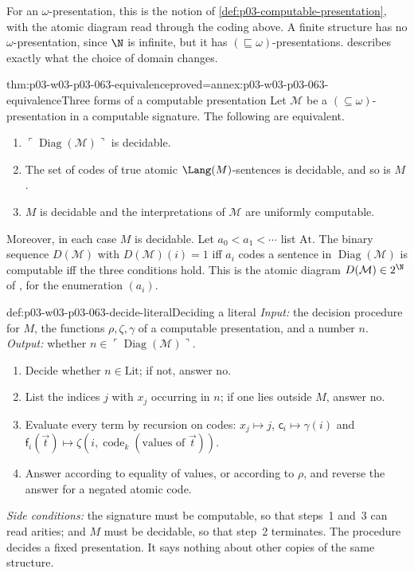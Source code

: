 For an \(\omega\)-presentation, this is the notion of
\cref{def:p03-computable-presentation}, with the atomic diagram read through
the coding above.  A finite structure has no \(\omega\)-presentation, since
\(\N\) is infinite, but it has \((\sqsubseteq\omega)\)-presentations.
 describes exactly what the choice of
domain changes.

\begin{hbtheorem}{thm:p03-w03-p03-063-equivalence}{proved=annex:p03-w03-p03-063-equivalence}{Three forms of a computable presentation}
Let \(\mathcal M\) be a \((\subseteq\omega)\)-presentation in a computable
signature.  The following are equivalent.
\begin{enumerate}
\item \(\ulcorner\operatorname{Diag}(\mathcal M)\urcorner\) is decidable.
\item The set of codes of true atomic \(\Lang(M)\)-sentences is decidable,
  and so is \(M\).
\item \(M\) is decidable and the interpretations of \(\mathcal M\) are
  uniformly computable.
\end{enumerate}
Moreover, in each case \(M\) is decidable.  Let \(a_0<a_1<\cdots\) list
\(\mathrm{At}\).  The binary sequence \(D(\mathcal M)\) with
\(D(\mathcal M)(i)=1\) iff \(a_i\) codes a sentence in
\(\operatorname{Diag}(\mathcal M)\) is computable iff the three conditions
hold.  This is the atomic diagram \(D(\mathcal M)\in2^{\N}\) of
\cite[Definition~I.2, p.~2]{Montalban2019CSTDraft}, for the enumeration
\((a_i)\).
\end{hbtheorem}

\begin{hbmethod}{def:p03-w03-p03-063-decide-literal}{Deciding a literal}
\emph{Input:} the decision procedure for \(M\), the functions
\(\rho,\zeta,\gamma\) of a computable presentation, and a number \(n\).
\emph{Output:} whether \(n\in\ulcorner\operatorname{Diag}(\mathcal M)\urcorner\).
\begin{enumerate}
\item Decide whether \(n\in\mathrm{Lit}\); if not, answer no.
\item List the indices \(j\) with \(x_j\) occurring in \(n\); if one lies
  outside \(M\), answer no.
\item Evaluate every term by recursion on codes:
  \(x_j\mapsto j\), \(\mathsf c_i\mapsto\gamma(i)\) and
  \(\mathsf f_i(\vec t)\mapsto\zeta(i,\operatorname{code}_k(\text{values of }\vec t))\).
\item Answer according to equality of values, or according to \(\rho\),
  and reverse the answer for a negated atomic code.
\end{enumerate}
\emph{Side conditions:} the signature must be computable, so that steps~1
and~3 can read arities; and \(M\) must be decidable, so that step~2
terminates.  The procedure decides a fixed presentation.  It says nothing
about other copies of the same structure.
\end{hbmethod}

